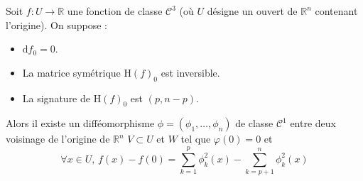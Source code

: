	\begin{lemma}[Morse]
		\label{lemme-de-morse-2}
		Soit $f : U \rightarrow \mathbb{R}$ une fonction de classe $\mathcal{C}^3$ (où $U$ désigne un ouvert de $\mathbb{R}^n$ contenant l'origine). On suppose :
		\begin{itemize}
			\item $\mathrm{d} f_0 = 0$.
			\item La matrice symétrique $\mathrm{H} (f)_0$ est inversible.
			\item La signature de $\mathrm{H}(f)_0$ est $(p, n-p)$.
		\end{itemize}
		Alors il existe un difféomorphisme $\phi = (\phi_1, \dots, \phi_n)$ de classe $\mathcal{C}^1$ entre deux voisinage de l'origine de $\mathbb{R}^n$ $V \subset U$ et $W$ tel que $\varphi(0) = 0$ et
		\[ \forall x \in U, \, f(x) - f(0) = \sum_{k=1}^p \phi_k^2(x) - \sum_{k=p+1}^n \phi_k^2(x) \]
	\end{lemma}

